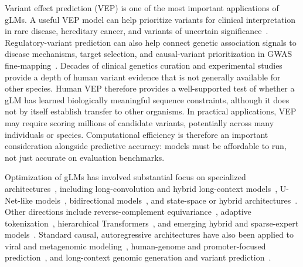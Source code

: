 \documentclass[a4paper,num-refs]{oup-contemporary}
\begin{document}
Variant effect prediction (VEP) is one of the most important applications of
gLMs.
A useful VEP model can help prioritize variants for clinical interpretation
in rare disease, hereditary cancer, and variants of uncertain
significance~\citep{brixi2026evo2,ye2025gpnstar,allal2026carbon,%
lin2025entaogpm}.
Regulatory-variant prediction can also help connect genetic association signals
to disease mechanisms, target selection, and causal-variant prioritization in
GWAS
fine-mapping~\citep{ye2025gpnstar,avsec2026alphagenome,pampari2024chrombpnet}.
Decades of clinical genetics curation
and experimental studies provide a depth of human variant evidence that is not
generally available for other species. Human VEP therefore provides a
well-supported test of whether a gLM has learned biologically meaningful
sequence constraints, although it does not by itself establish transfer to
other organisms.
In practical applications,
VEP may require scoring millions of candidate variants, potentially across
many individuals or species. Computational efficiency is therefore an important
consideration alongside predictive accuracy: models must be affordable to run,
not just accurate on evaluation benchmarks.

Optimization of gLMs has involved substantial focus on specialized
architectures~\citep{benegas2025review}, including long-convolution and hybrid
long-context models~\citep{nguyen2023hyenadna,brixi2026evo2}, U-Net-like
models~\citep{boshar2026ntv3}, bidirectional
models~\citep{zhou2024dnabert2,fishman2025genalm,zhai2026plantcad2,%
yang2025trinitydna},
and state-space or hybrid
architectures~\citep{ma2025hybridna,schiff2024caduceus,zhai2026plantcad2}.
Other directions include reverse-complement
equivariance~\citep{schiff2024caduceus}, adaptive
tokenization~\citep{shah2026dnahnet,kim2026dnachunker,qiao2024mxdna},
hierarchical Transformers~\citep{shao2024megadna}, and emerging hybrid and
sparse-expert models~\citep{duan2025janusdna,lin2025plantbimoe}. Standard
causal, autoregressive architectures have also been applied to viral and
metagenomic modeling~\citep{zvyagin2022genslm,liu2025metagene1}, human-genome
and promoter-focused prediction~\citep{zhang2023dnagpt,shearer2024loleve},
and long-context genomic generation and variant
prediction~\citep{wu2025generator,li2026generatorv2,vishniakov2025gene42,%
allal2026carbon}.
\end{document}
